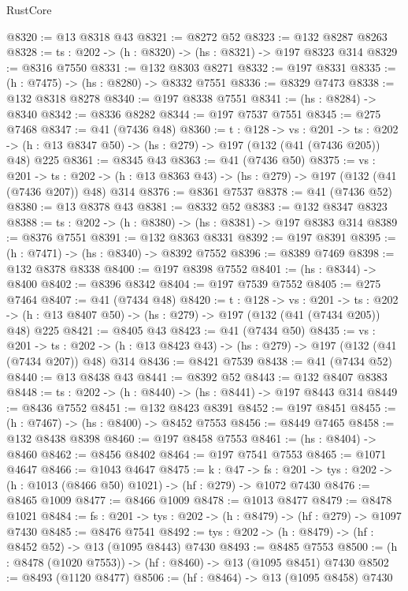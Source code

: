\begin{lexlean}{RustCore}
\begin{coremodule}
@8320 := @13 @8318 @43
@8321 := @8272 @52
@8323 := @132 @8287 @8263
@8328 := {ts : @202} -> (h : @8320) -> (hs : @8321) -> @197 @8323 @314
@8329 := @8316 @7550
@8331 := @132 @8303 @8271
@8332 := @197 @8331
@8335 := (h : @7475) -> (hs : @8280) -> @8332 @7551
@8336 := @8329 @7473
@8338 := @132 @8318 @8278
@8340 := @197 @8338 @7551
@8341 := (hs : @8284) -> @8340
@8342 := @8336 @8282
@8344 := @197 @7537 @7551
@8345 := @275 @7468
@8347 := @41 (@7436 @48)
@8360 := {t : @128} ->
  {vs : @201} ->
  {ts : @202} -> (h : @13 @8347 @50) -> (hs : @279) -> @197 (@132 (@41 (@7436 @205)) @48) @225
@8361 := @8345 @43
@8363 := @41 (@7436 @50)
@8375 := {vs : @201} ->
  {ts : @202} -> (h : @13 @8363 @43) -> (hs : @279) -> @197 (@132 (@41 (@7436 @207)) @48) @314
@8376 := @8361 @7537
@8378 := @41 (@7436 @52)
@8380 := @13 @8378 @43
@8381 := @8332 @52
@8383 := @132 @8347 @8323
@8388 := {ts : @202} -> (h : @8380) -> (hs : @8381) -> @197 @8383 @314
@8389 := @8376 @7551
@8391 := @132 @8363 @8331
@8392 := @197 @8391
@8395 := (h : @7471) -> (hs : @8340) -> @8392 @7552
@8396 := @8389 @7469
@8398 := @132 @8378 @8338
@8400 := @197 @8398 @7552
@8401 := (hs : @8344) -> @8400
@8402 := @8396 @8342
@8404 := @197 @7539 @7552
@8405 := @275 @7464
@8407 := @41 (@7434 @48)
@8420 := {t : @128} ->
  {vs : @201} ->
  {ts : @202} -> (h : @13 @8407 @50) -> (hs : @279) -> @197 (@132 (@41 (@7434 @205)) @48) @225
@8421 := @8405 @43
@8423 := @41 (@7434 @50)
@8435 := {vs : @201} ->
  {ts : @202} -> (h : @13 @8423 @43) -> (hs : @279) -> @197 (@132 (@41 (@7434 @207)) @48) @314
@8436 := @8421 @7539
@8438 := @41 (@7434 @52)
@8440 := @13 @8438 @43
@8441 := @8392 @52
@8443 := @132 @8407 @8383
@8448 := {ts : @202} -> (h : @8440) -> (hs : @8441) -> @197 @8443 @314
@8449 := @8436 @7552
@8451 := @132 @8423 @8391
@8452 := @197 @8451
@8455 := (h : @7467) -> (hs : @8400) -> @8452 @7553
@8456 := @8449 @7465
@8458 := @132 @8438 @8398
@8460 := @197 @8458 @7553
@8461 := (hs : @8404) -> @8460
@8462 := @8456 @8402
@8464 := @197 @7541 @7553
@8465 := @1071 @4647
@8466 := @1043 @4647
@8475 := {k : @47} ->
  {fs : @201} -> {tys : @202} -> (h : @1013 (@8466 @50) @1021) -> (hf : @279) -> @1072 @7430
@8476 := @8465 @1009
@8477 := @8466 @1009
@8478 := @1013 @8477
@8479 := @8478 @1021
@8484 := {fs : @201} -> {tys : @202} -> (h : @8479) -> (hf : @279) -> @1097 @7430
@8485 := @8476 @7541
@8492 := {tys : @202} -> (h : @8479) -> (hf : @8452 @52) -> @13 (@1095 @8443) @7430
@8493 := @8485 @7553
@8500 := (h : @8478 (@1020 @7553)) -> (hf : @8460) -> @13 (@1095 @8451) @7430
@8502 := @8493 (@1120 @8477)
@8506 := (hf : @8464) -> @13 (@1095 @8458) @7430

\end{coremodule}
\end{lexlean}
